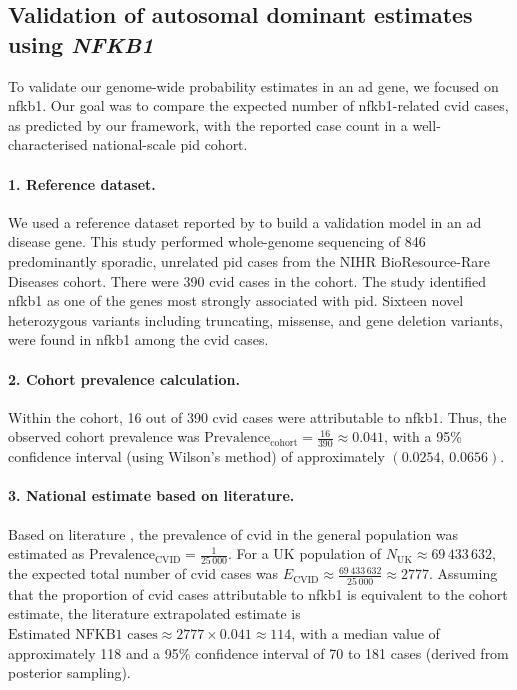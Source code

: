 \subsection{Validation of autosomal dominant estimates using \textit{NFKB1}}

To validate our genome-wide probability estimates in an \ac{ad} gene, we focused on \ac{nfkb1}. 
Our goal was to compare the expected number of \ac{nfkb1}-related \ac{cvid} cases, as predicted by our framework, with the reported case count in a well-characterised national-scale \ac{pid} cohort.

\paragraph{1. Reference dataset.}
We used a reference dataset reported by \citet{tuijnenburgNFKB12018} to build a validation model in an \ac{ad} disease gene. This study performed whole-genome sequencing of 846 predominantly sporadic, unrelated \ac{pid} cases from the NIHR BioResource-Rare Diseases cohort. There were 390 \ac{cvid} cases in the cohort. The study identified \ac{nfkb1} as one of the genes most strongly associated with \ac{pid}. Sixteen novel heterozygous variants including truncating, missense, and gene deletion variants, were found in \ac{nfkb1} among the \ac{cvid} cases.

\paragraph{2. Cohort prevalence calculation.}
Within the cohort, 16 out of 390 \ac{cvid} cases were attributable to \ac{nfkb1}. 
Thus, the observed cohort prevalence was
$
\text{Prevalence}_{\text{cohort}} = \frac{16}{390} \approx 0.041$,
with a 95\% confidence interval (using Wilson's method) of approximately \((0.0254,\,0.0656)\).

\paragraph{3. National estimate based on literature.}
Based on literature
\cite{tuijnenburgNFKB12018, who1997primary, oksenhendler2008infections},
the prevalence of \ac{cvid} in the general population was estimated as
$\text{Prevalence}_{\text{CVID}} = \frac{1}{25\,000}$.
For a UK population of  $N_{\text{UK}} \approx 69\,433\,632,$
the expected total number of \ac{cvid} cases was
$E_{\text{CVID}} \approx \frac{69\,433\,632}{25\,000} \approx 2777.$
Assuming that the proportion of \ac{cvid} cases attributable to \ac{nfkb1} is equivalent to the cohort estimate, the literature extrapolated estimate is
$\text{Estimated NFKB1 cases} \approx 2777 \times 0.041 \approx 114$,
with a median value of approximately 118 and a 95\% confidence interval of 70 to 181 cases (derived from posterior sampling).

